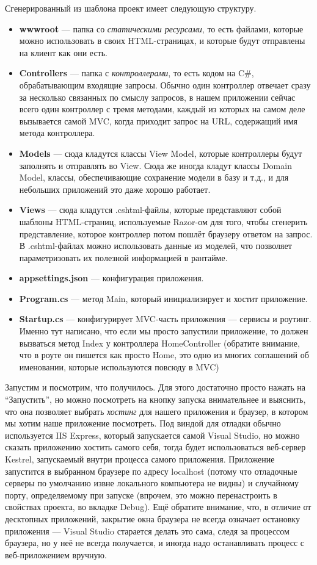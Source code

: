 \documentclass[a5paper]{article}
\begin{document}
Сгенерированный из шаблона проект имеет следующую структуру.
\begin{itemize}
	\item \textbf{wwwroot} --- папка со \textit{статическими ресурсами}, то есть файлами, которые можно использовать в своих HTML-страницах, и которые будут отправлены на клиент как они есть.
	\item \textbf{Controllers} --- папка с \textit{контроллерами}, то есть кодом на C\#, обрабатывающим входящие запросы. Обычно один контроллер отвечает сразу за несколько связанных по смыслу запросов,
		в нашем приложении сейчас всего один контроллер с тремя методами, каждый из которых на самом деле вызывается самой MVC, когда приходит запрос на URL, содержащий имя метода контроллера.
	\item \textbf{Models} --- сюда кладутся классы View Model, которые контроллеры будут заполнять и отправлять во View. Сюда же иногда кладут классы Domain Model, классы, обеспечивающие сохранение модели в базу и т.д., и для небольших приложений это даже хорошо работает.
	\item \textbf{Views} --- сюда кладутся .cshtml-файлы, которые представляют собой шаблоны HTML-страниц, используемые Razor-ом для того, чтобы сгенерить представление, которое контроллер потом пошлёт браузеру ответом на запрос. В .cshtml-файлах можно использовать
		данные из моделей, что позволяет параметризовать их полезной информацией в рантайме.
	\item \textbf{appsettings.json} --- конфигурация приложения.
	\item \textbf{Program.cs} --- метод Main, который инициализирует и хостит приложение.
	\item \textbf{Startup.cs} --- конфигурирует MVC-часть приложения --- сервисы и роутинг. Именно тут написано, что если мы просто запустили приложение, то должен вызваться метод Index у контроллера HomeController (обратите внимание, что в роуте он пишется как просто Home, 
		это одно из многих соглашений об именовании, которые используются повсюду в MVC)
\end{itemize}

Запустим и посмотрим, что получилось. Для этого достаточно просто нажать на ``Запустить'', но можно посмотреть на кнопку запуска внимательнее и выяснить, что она позволяет выбрать \textit{хостинг} для нашего приложения и браузер, в котором мы хотим наше приложение посмотреть.
Под виндой для отладки обычно используется IIS Express, который запускается самой Visual Studio, но можно сказать приложению хостить самого себя, тогда будет использоваться веб-сервер Kestrel, запускаемый внутри процесса самого приложения. Приложение запустится в выбранном браузере
по адресу localhost (потому что отладочные серверы по умолчанию извне локального компьютера не видны) и случайному порту, определяемому при запуске (впрочем, это можно перенастроить в свойствах проекта, во вкладке Debug). Ещё обратите внимание, что, в отличие от десктопных приложений,
закрытие окна браузера не всегда означает остановку приложения --- Visual Studio старается делать это сама, следя за процессом браузера, но у неё не всегда получается, и иногда надо останавливать процесс с веб-приложением вручную.
\end{document}
